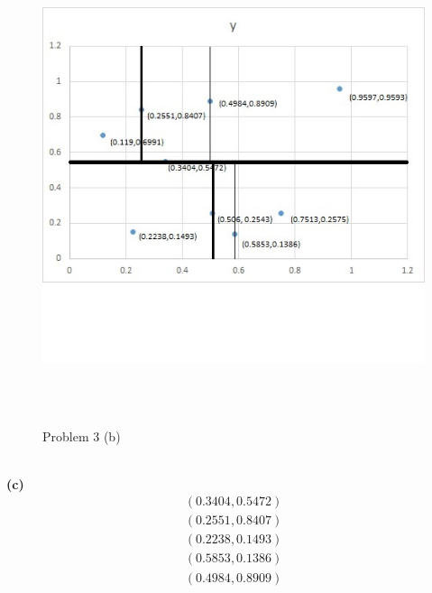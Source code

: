 \documentclass[11pt]{scrartcl}
\begin{document}
 \begin{figure} 
	\includegraphics[width=5.5in,height=5.5in]{Q3.jpg}
	\caption{Problem 3 (b)}
\end{figure}
\\
 \textbf{(c)}\\
  \begin{equation*}
\begin{aligned}
 (0.3404,0.5472)\\
 (0.2551,0.8407) \\
 (0.2238,0.1493)\\
 (0.5853,0.1386)\\
 (0.4984,0.8909)\\
 \end{aligned}
\end{equation*}
 \\
\end{document}
